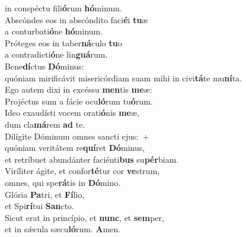 \evenverse in conspéctu fili\textbf{ó}rum \textbf{hó}minum.\\
\oddverse Abscóndes eos in abscóndito faci\textbf{é}i \textbf{tu}æ~\*\\
\oddverse a conturbati\textbf{ó}ne \textbf{hó}minum.\\
\evenverse Próteges eos in taber\textbf{ná}culo \textbf{tu}o~\*\\
\evenverse a contradicti\textbf{ó}ne lin\textbf{guá}rum.\\
\oddverse Bene\textbf{dí}ctus \textbf{Dó}minus:~\*\\
\oddverse quóniam mirificávit misericórdiam suam mihi in civi\textbf{tá}te mu\textbf{ní}ta.\\
\evenverse Ego autem dixi in excéssu \textbf{men}tis \textbf{me}æ:~\*\\
\evenverse Projéctus sum a fácie ocu\textbf{ló}rum tu\textbf{ó}rum.\\
\oddverse Ideo exaudísti vocem orati\textbf{ó}nis \textbf{me}æ,~\*\\
\oddverse dum cla\textbf{má}rem \textbf{ad} te.\\
\evenverse Dilígite Dóminum omnes sancti ejus:~+\\
\evenverse  quóniam veritátem re\textbf{quí}ret \textbf{Dó}minus,~\*\\
\evenverse et retríbuet abundánter faciénti\textbf{bus} su\textbf{pér}biam.\\
\oddverse Viríliter ágite, et confor\textbf{té}tur cor \textbf{ve}strum,~\*\\
\oddverse omnes, qui spe\textbf{rá}tis in \textbf{Dó}mino.\\
\evenverse Glória \textbf{Pa}tri, et \textbf{Fí}lio,~\*\\
\evenverse et Spi\textbf{rí}tui \textbf{San}cto.\\
\oddverse Sicut erat in princípio, et \textbf{nunc}, et \textbf{sem}per,~\*\\
\oddverse et in sǽcula sæcu\textbf{ló}rum. \textbf{A}men.\\
